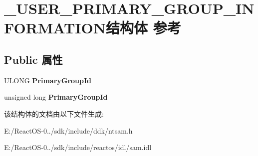 \hypertarget{struct___u_s_e_r___p_r_i_m_a_r_y___g_r_o_u_p___i_n_f_o_r_m_a_t_i_o_n}{}\section{\+\_\+\+U\+S\+E\+R\+\_\+\+P\+R\+I\+M\+A\+R\+Y\+\_\+\+G\+R\+O\+U\+P\+\_\+\+I\+N\+F\+O\+R\+M\+A\+T\+I\+O\+N结构体 参考}
\label{struct___u_s_e_r___p_r_i_m_a_r_y___g_r_o_u_p___i_n_f_o_r_m_a_t_i_o_n}
\subsection*{Public 属性}
\begin{DoxyCompactItemize}
\item 
\mbox{\label{struct___u_s_e_r___p_r_i_m_a_r_y___g_r_o_u_p___i_n_f_o_r_m_a_t_i_o_n_a0afb36be38b5a8d4797324edac0da250}} 
U\+L\+O\+NG {\bfseries Primary\+Group\+Id}
\item 
\mbox{\label{struct___u_s_e_r___p_r_i_m_a_r_y___g_r_o_u_p___i_n_f_o_r_m_a_t_i_o_n_aad7f88c7177337034c2ac508a8159456}} 
unsigned long {\bfseries Primary\+Group\+Id}
\end{DoxyCompactItemize}


该结构体的文档由以下文件生成\+:\begin{DoxyCompactItemize}
\item 
E\+:/\+React\+O\+S-\/0../sdk/include/ddk/ntsam.\+h\item 
E\+:/\+React\+O\+S-\/0../sdk/include/reactos/idl/sam.\+idl\end{DoxyCompactItemize}
